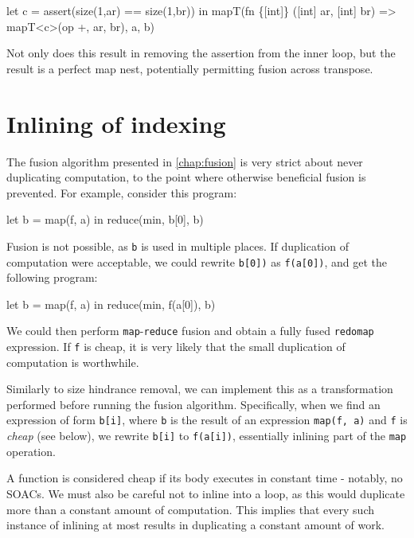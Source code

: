\begin{colorcode}
let c = assert(size(1,ar) == size(1,br)) in
mapT(fn \{[int]\} ([int] ar, [int] br) =>
       mapT<c>(op +, ar, br),
     a, b)
\end{colorcode}

Not only does this result in removing the assertion from the inner
loop, but the result is a perfect map nest, potentially permitting
fusion across transpose.

\section{Inlining of indexing}
\label{sec:inlining-indexing}

The fusion algorithm presented in \cref{chap:fusion} is very strict
about never duplicating computation, to the point where otherwise
beneficial fusion is prevented.  For example, consider this program:

\begin{colorcode}
let b = map(f, a) in
reduce(min, b[0], b)
\end{colorcode}

Fusion is not possible, as \texttt{b} is used in multiple places.  If
duplication of computation were acceptable, we could rewrite
\texttt{b[0])} as \texttt{f(a[0])}, and get the following program:

\begin{colorcode}
let b = map(f, a) in
reduce(min, f(a[0]), b)
\end{colorcode}

We could then perform \texttt{map}-\texttt{reduce} fusion and obtain a
fully fused \texttt{redomap} expression.  If \texttt{f} is cheap, it
is very likely that the small duplication of computation is
worthwhile.

Similarly to size hindrance removal, we can implement this as a
transformation performed before running the fusion algorithm.
Specifically, when we find an expression of form \texttt{b[i]}, where
\texttt{b} is the result of an expression \texttt{map(f, a)} and
\texttt{f} is \textit{cheap} (see below), we rewrite \texttt{b[i]} to
\texttt{f(a[i])}, essentially inlining part of the \texttt{map}
operation.

A function is considered cheap if its body executes in constant time -
notably, no SOACs.  We must also be careful not to inline into a loop,
as this would duplicate more than a constant amount of computation.
This implies that every such instance of inlining at most results in
duplicating a constant amount of work.

